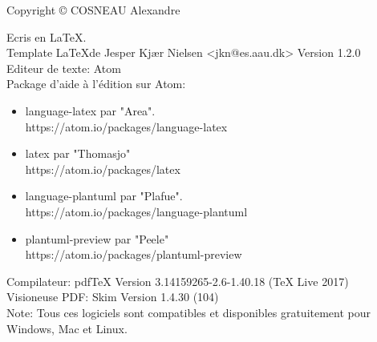 \thispagestyle{empty}
{\small
\strut\vfill %
\noindent Copyright \copyright{} COSNEAU Alexandre\par
\vspace{0.2cm}
\noindent Ecris en \LaTeX. \\
Template \LaTeX de Jesper Kjær Nielsen <jkn@es.aau.dk> Version 1.2.0 \\
Editeur de texte: Atom \\
Package d'aide à l'édition sur Atom:
\begin{itemize}
  \item language-latex par "Area". \\
  https://atom.io/packages/language-latex
  \item latex par "Thomasjo" \\
  https://atom.io/packages/latex
  \item language-plantuml par "Plafue". \\
  https://atom.io/packages/language-plantuml
  \item plantuml-preview par "Peele" \\
  https://atom.io/packages/plantuml-preview
\end{itemize}

Compilateur: pdfTeX Version 3.14159265-2.6-1.40.18 (TeX Live 2017) \\
Visioneuse PDF: Skim Version 1.4.30 (104) \\

Note: Tous ces logiciels sont compatibles et disponibles gratuitement pour Windows, Mac et Linux.
}
\clearpage

